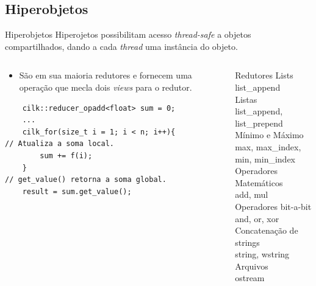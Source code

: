 \documentclass{beamer}
\begin{document}
\subsection{Hiperobjetos}
\begin{frame}[fragile]{Hiperobjetos}
    Hiperojetos possibilitam acesso \textit{thread-safe} a objetos compartilhados, dando a cada \textit{thread} uma instância do objeto.
\begin{columns}[T]
\begin{column}{0.5\textwidth}
\begin{itemize}
    \item São em sua maioria redutores e fornecem uma operação que mecla dois \textit{views} para o redutor. 
\end{itemize}
\begin{footnotesize}
\begin{block}{}
\begin{lstlisting}
    cilk::reducer_opadd<float> sum = 0;
    ...
    cilk_for(size_t i = 1; i < n; i++){
// Atualiza a soma local.
        sum += f(i);
    }
// get_value() retorna a soma global.
    result = sum.get_value(); 
\end{lstlisting}
\end{block}
\end{footnotesize}

\end{column}

\begin{column}{0.4\textwidth}
\begin{footnotesize}
\begin{block}{Redutores}
Lists \\
\qquad list\_append \\
Listas \\
\qquad list\_append, list\_prepend \\
Mínimo e Máximo \\
\qquad max, max\_index, min, min\_index \\
Operadores Matemáticos \\
\qquad add, mul \\
Operadores bit-a-bit \\
\qquad and, or, xor \\
Concatenação de strings \\
\qquad string, wstring \\
Arquivos \\
\qquad ostream
\end{block}
\end{footnotesize}

\end{column}

\end{columns}
\end{frame}
\end{document}
